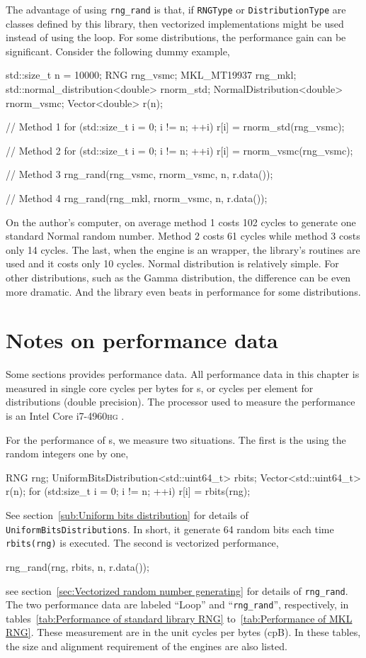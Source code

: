 The advantage of using \verb|rng_rand| is that, if \verb|RNGType| or
\verb|DistributionType| are classes defined by this library, then vectorized
implementations might be used instead of using the loop. For some
distributions, the performance gain can be significant. Consider the following
dummy example,
\begin{cppcode}
  std::size_t n = 10000;
  RNG rng_vsmc;
  MKL_MT19937 rng_mkl;
  std::normal_distribution<double> rnorm_std;
  NormalDistribution<double> rnorm_vsmc;
  Vector<double> r(n);

  // Method 1
  for (std::size_t i = 0; i != n; ++i)
      r[i] = rnorm_std(rng_vsmc);

  // Method 2
  for (std::size_t i = 0; i != n; ++i)
      r[i] = rnorm_vsmc(rng_vsmc);

  // Method 3
  rng_rand(rng_vsmc, rnorm_vsmc, n, r.data());

  // Method 4
  rng_rand(rng_mkl, rnorm_vsmc, n, r.data());
\end{cppcode}
On the author's computer, on average method 1 costs 102 cycles to generate one
standard Normal random number. Method 2 costs 61 cycles while method 3 costs
only 14 cycles. The last, when the \rng{} engine is an \mkl{} \rng wrapper, the
\mkl library's routines are used and it costs only 10 cycles. Normal
distribution is relatively simple. For other distributions, such as the Gamma
distribution, the difference can be even more dramatic. And the library even
beats \mkl in performance for some distributions.

\section{Notes on performance data}
\label{sec:Notes on performance data}

Some sections provides performance data. All performance data in this chapter
is measured in single core cycles per bytes for \rng{}s, or cycles per element
for distributions (double precision). The processor used to measure the
performance is an Intel Core i7-4960\textsc{hg} \cpu.

For the performance of \rng{}s, we measure two situations. The first is the
using the random integers one by one,
\begin{cppcode}
  RNG rng;
  UniformBitsDistribution<std::uint64_t> rbits;
  Vector<std::uint64_t> r(n);
  for (std:size_t i = 0; i != n; ++i)
      r[i] = rbits(rng);
\end{cppcode}
See section~\ref{sub:Uniform bits distribution} for details of
\verb|UniformBitsDistributions|. In short, it generate 64 random bits each time
\verb|rbits(rng)| is executed. The second is vectorized performance,
\begin{cppcode}
  rng_rand(rng, rbits, n, r.data());
\end{cppcode}
see section~\ref{sec:Vectorized random number generating} for details of
\verb|rng_rand|. The two performance data are labeled ``Loop'' and
``\verb|rng_rand|'', respectively, in tables~\ref{tab:Performance of standard
  library RNG} to~\ref{tab:Performance of MKL RNG}. These measurement are in
the unit cycles per bytes (cpB). In these tables, the size and alignment
requirement of the \rng engines are also listed.

